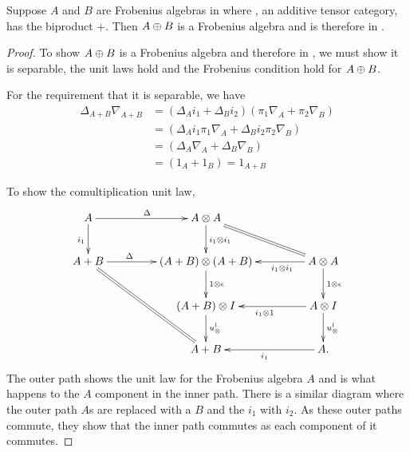 \begin{lemma}\label{prop:biproducts-of-frobenius-objects-are-frobenius}
  Suppose $A$ and $B$ are Frobenius algebras in \CFrob where \X, an additive tensor category, has
  the biproduct $+$.
  Then $A\oplus B$ is a Frobenius algebra and is therefore in \CFrob.
\end{lemma}
\begin{proof}

  To show $A\oplus B$ is a Frobenius algebra and therefore in \CFrob, we must show it is separable,
  the unit laws hold and the Frobenius condition hold for $A\oplus B$.

  For the requirement that it is separable, we have
  \begin{align*}
    \Delta_{A+B}\nabla_{A+B}&= (\Delta_A i_1 + \Delta_B i_2) (\pi_1 \nabla_A + \pi_2 \nabla_B)\\
    &=  (\Delta_A i_1 \pi_1 \nabla_A + \Delta_B i_2\pi_2 \nabla_B)\\
    &=  (\Delta_A \nabla_A + \Delta_B \nabla_B)\\
    &=  (1_A + 1_B) = 1_{A+B}
  \end{align*}


  To show the comultiplication unit law,
  \[
     \xymatrix@C+20pt{
       A \ar[r]^{\Delta} \ar[d]_{i_1} & A\*A \ar[d]^{i_1\*i_1} \ar@{=}[dr] \\
       A+B \ar[r]^(.35){\Delta} \ar@{=}[ddr] &(A+B)\*(A+B) \ar[d]^{1\*\epsilon}
          & A\*A \ar[l]^(.35){i_1\*i_1}  \ar[d]^{1\*\epsilon}\\
       & (A+B)\*I \ar[d]^{\usl} & A\*I \ar[d]^{\usl} \ar[l]^{i_1\*1}\\
       & A+B & A. \ar[l]^{i_1}
     }
  \]
  The outer path shows the unit law for the Frobenius algebra $A$ and is what happens to the $A$
  component in the inner path. There is a similar diagram where the outer path $A$s are replaced
  with a $B$ and the $i_1$ with $i_2$. As these outer paths commute, they show that the inner path
  commutes as each component of it commutes.


\end{proof}
